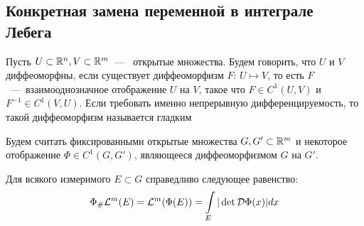 \subsection{Конкретная замена переменной в интеграле Лебега}
\begin{reminder}
    Пусть $U \subset \mathbb{R}^n, V \subset \mathbb{R}^m$~---~ открытые множества. Будем говорить, что $U$ и $V$ диффеоморфны, если существует диффеоморфизм $F$: $U \mapsto V$, то есть $F$~---~взаимооднозначное отображение $U$ на $V$, такое что $F \in C^1(U, V)$ и  $F^{-1} \in C^1(V, U)$. Если требовать именно непрерывную дифференцируемость, то такой диффеоморфизм называется гладким
\end{reminder}
Будем считать фиксированными открытые множества $G, G' \subset \mathbb{R}^m$ и некоторое отображение $\Phi \in C^1(G, G')$, являющееся диффеоморфизмом $G$ на $G'$.
\begin{theorem}
    Для всякого измеримого $E \subset G$ справедливо следующее равенство: \[\Phi_\#\mathcal{L}^m(E) = \mathcal{L}^m(\Phi(E)) = \int\limits_E|\det \mathcal{D}\Phi(x)|dx\]
\end{theorem}
